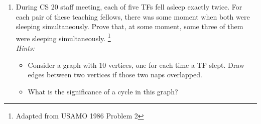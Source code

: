 \documentclass[12pt]{article}
\begin{document}
\begin{enumerate}
\item During CS 20 staff meeting, each of five TFs fell asleep exactly twice.  For each pair of these teaching fellows,
  there was some moment when both were sleeping simultaneously.  Prove that, at some moment, some three of them were sleeping simultaneously.
  \footnote{Adapted from USAMO 1986 Problem 2} \vspace{6 pt} \\
  \emph{Hints:}
  \begin{itemize}
    \item Consider a graph with 10 vertices, one for each time a TF slept.  Draw edges between two vertices if those two naps overlapped.
    \item What is the significance of a cycle in this graph?
  \end{itemize}

\end{enumerate}
\end{document}
